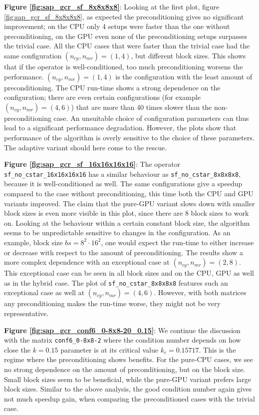 \documentclass{article}
\theoremstyle{plain} %
\theoremstyle{convention} %
\theoremstyle{remark} %
\def\code#1{\texttt{#1}}
\numberwithin{equation}{section}
\begin{document}
\textbf{Figure \ref{fig:sap_gcr_sf_8x8x8x8}}: Looking at the first plot, figure \ref{fig:sap_gcr_sf_8x8x8x8}, as expected the preconditioning gives no significant improvement; on the CPU only \num{4} setups were faster than the one without preconditioning, on the GPU even none of the preconditioning setups surpasses the trivial case. All the CPU cases that were faster than the trivial case had the same configuration $(n_{cy}, n_{mr}) = (1,4)$, but different block sizes. This shows that if the operator is well-conditioned, too much preconditioning worsens the performance. $(n_{cy}, n_{mr}) = (1,4)$ is the configuration with the least amount of preconditioning. The CPU run-time shows a strong dependence on the configuration; there are even certain configurations (for example $(n_{cy}, n_{mr}) = (4,6)$) that are more than \num{40} times slower than the non-preconditioning case. An unsuitable choice of configuration parameters can thus lead to a significant performance degradation. However, the plots show that performance of the algorithm is overly sensitive to the choice of these parameters. The adaptive variant should here come to the rescue.

\textbf{Figure \ref{fig:sap_gcr_sf_16x16x16x16}}: The operator \code{sf\_no\_cstar\_16x16x16x16} has a similar behaviour as \code{sf\_no\_cstar\_8x8x8x8}, because it is well-conditioned as well. The same configurations give a speedup compared to the case without preconditioning, this time both the CPU and GPU variants improved. The claim that the pure-GPU variant slows down with smaller block sizes is even more visible in this plot, since there are \num{8} block sizes to work on. Looking at the behaviour within a certain constant block size, the algorithm seems to be unpredictable sensitive to changes in the configuration. As an example, block size $bs= 8^2 \cdot 16^2$, one would expect the run-time to either increase or decrease with respect to the amount of preconditioning. The results show a more complex dependence with an exceptional case at $(n_{cy}, n_{mr}) = (2,8)$. This exceptional case can be seen in all block sizes and on the CPU, GPU as well as in the hybrid case. The plot of \code{sf\_no\_cstar\_8x8x8x8} features such an exceptional case as well at $(n_{cy}, n_{mr}) = (4,6)$. However, with both matrices any preconditioning makes the run-time worse, they might not be very representative.

\textbf{Figure \ref{fig:sap_gcr_conf6_0-8x8-20_0.15}}: We continue the discussion with the matrix \code{conf6\_0-8x8-2} where the condition number depends on how close the $k = 0.15$ parameter is at its critical value $k_c = 0.15717$. This is the regime where the preconditioning shows benefits. For the pure-CPU cases, we see no strong dependence on the amount of preconditioning, but on the block size. Small block sizes seem to be beneficial, while the pure-GPU variant prefers large block sizes. Similar to the above analysis, the good condition number again gives not much speedup gain, when comparing the preconditioned cases with the trivial case.
\end{document}
